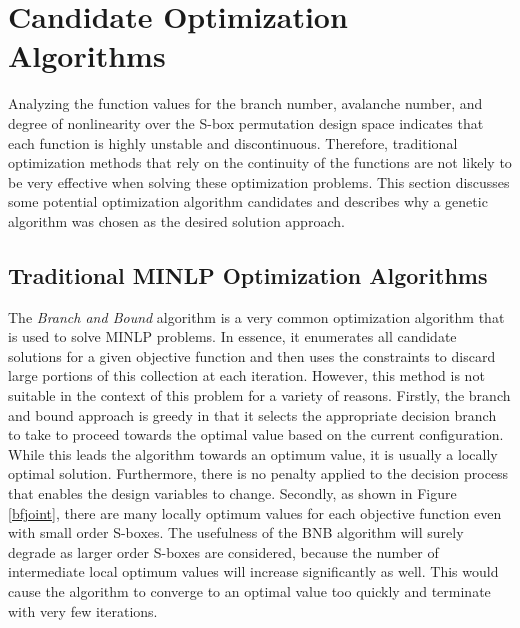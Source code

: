 \documentclass[11pt]{article}
\begin{document}
\section{Candidate Optimization Algorithms}

Analyzing the function values for the branch number, avalanche number, and degree of nonlinearity over the S-box permutation design space indicates that each function is highly unstable and discontinuous. Therefore, traditional optimization methods that rely on the continuity of the functions are not likely to be very effective when solving these optimization problems. This section discusses some potential optimization algorithm candidates and describes why a genetic algorithm was chosen as the desired solution approach.

\subsection{Traditional MINLP Optimization Algorithms}

The \emph{Branch and Bound} algorithm is a very common optimization algorithm that is used to solve MINLP problems. In essence, it enumerates all candidate solutions for a given objective function and then uses the constraints to discard large portions of this collection at each iteration. However, this method is not suitable in the context of this problem for a variety of reasons. Firstly, the branch and bound approach is greedy in that it selects the appropriate decision branch to take to proceed towards the optimal value based on the current configuration. While this leads the algorithm towards an optimum value, it is usually a locally optimal solution. Furthermore, there is no penalty applied to the decision process that enables the design variables to change. Secondly, as shown in Figure \ref{bfjoint}, there are many locally optimum values for each objective function even with small order S-boxes. The usefulness of the BNB algorithm will surely degrade as larger order S-boxes are considered, because the number of intermediate local optimum values will increase significantly as well. This would cause the algorithm to converge to an optimal value too quickly and terminate with very few iterations. 
\end{document}
